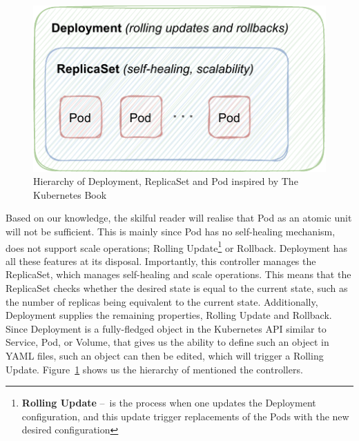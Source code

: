 \begin{enumerate}
    \begin{figure}[!htb]
        \centering
        \includegraphics[scale=1.2]{obrazky-figures/02-preliminaries/01-kubernetes/03-deplyoment-archite}
        \caption{Hierarchy of Deployment, ReplicaSet and Pod inspired by The Kubernetes Book \cite{kubernetesBook}}
        \label{fig:kubernetes:deploymentReplicaSetPod}
    \end{figure}
    Based on our knowledge, the skilful reader will realise that Pod as an atomic unit will not be sufficient.
    This is mainly since Pod has no self-healing mechanism, does not support scale operations;
    Rolling Update\footnote{\textbf{Rolling Update} \---\ is the process when one updates the Deployment configuration, and this update trigger replacements of the Pods with the new desired configuration} or Rollback.
    Deployment has all these features at its disposal.
    Importantly, this controller manages the ReplicaSet, which manages self-healing and scale operations.
    This means that the ReplicaSet checks whether the desired state is equal to the current state, such as the number of replicas being equivalent to the current state.
    Additionally, Deployment supplies the remaining properties, Rolling Update and Rollback.
    Since Deployment is a fully-fledged object in the Kubernetes API similar to Service, Pod, or Volume, that gives us the ability to define such an object in YAML files, such an object can then be edited, which will trigger a Rolling Update.
    Figure~\ref{fig:kubernetes:deploymentReplicaSetPod} shows us the hierarchy of mentioned the controllers.


\end{enumerate}

